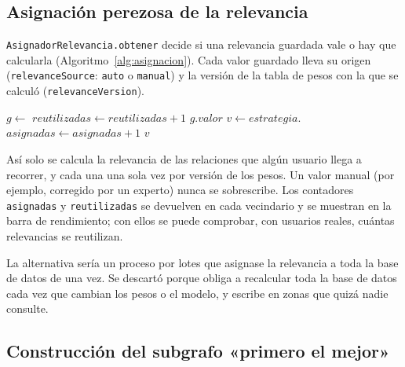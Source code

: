 \subsection{Asignación perezosa de la relevancia}
\label{sec:alg-asignacion}

\texttt{AsignadorRelevancia.obtener} decide si una relevancia guardada vale o hay que calcularla (Algoritmo~\ref{alg:asignacion}). Cada valor guardado lleva su origen (\texttt{relevanceSource}: \texttt{auto} o \texttt{manual}) y la versión de la tabla de pesos con la que se calculó (\texttt{relevanceVersion}).

\begin{algorithm}[htbp]
  \caption{Obtención de la relevancia de un intermediario (\texttt{AsignadorRelevancia.obtener}).}
  \label{alg:asignacion}
  \begin{algorithmic}[1]
      \State $g \gets$  
        \State $reutilizadas \gets reutilizadas + 1$
        \State \Return $g.valor$
      \EndIf
      \State $v \gets estrategia.$
      \State {}
      \State $asignadas \gets asignadas + 1$
      \State \Return $v$
    \EndFunction
  \end{algorithmic}
\end{algorithm}

Así solo se calcula la relevancia de las relaciones que algún usuario llega a recorrer, y cada una una sola vez por versión de los pesos. Un valor manual (por ejemplo, corregido por un experto) nunca se sobrescribe. Los contadores \texttt{asignadas} y \texttt{reutilizadas} se devuelven en cada vecindario y se muestran en la barra de rendimiento; con ellos se puede comprobar, con usuarios reales, cuántas relevancias se reutilizan.

La alternativa sería un proceso por lotes que asignase la relevancia a toda la base de datos de una vez. Se descartó porque obliga a recalcular toda la base de datos cada vez que cambian los pesos o el modelo, y escribe en zonas que quizá nadie consulte.

\subsection{Construcción del subgrafo «primero el mejor»}
\label{sec:alg-subgrafo}

